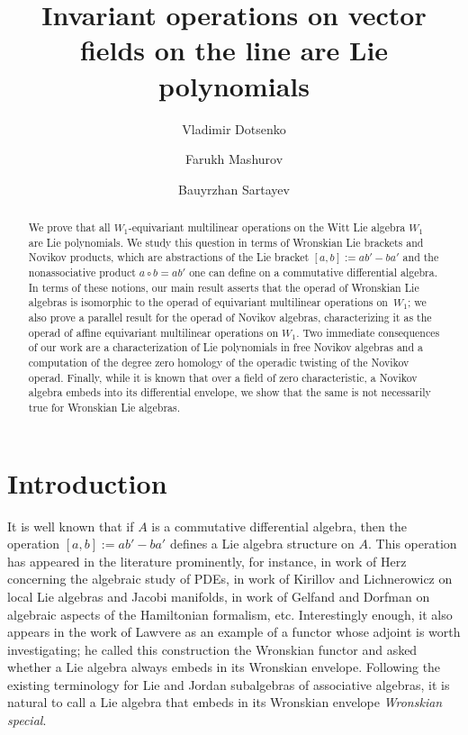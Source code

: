 \documentclass[11pt,reqno]{amsart}
\title{Invariant operations on vector fields on the line are Lie polynomials}
\author{Vladimir Dotsenko}
\author{Farukh Mashurov}
\author{Bauyrzhan Sartayev}
\theoremstyle{plain}
\theoremstyle{definition}
\theoremstyle{remark}
\begin{document}
\begin{abstract}
We prove that all $W_1$-equivariant multilinear operations on the Witt Lie algebra $W_1$ are Lie polynomials. We study this question in terms of Wronskian Lie brackets and Novikov products, which are abstractions of the Lie bracket $[a,b]:=ab'-ba'$ and the nonassociative product $a\circ b=ab'$ one can define on a commutative differential algebra. In terms of these notions, our main result asserts that the operad of Wronskian Lie algebras is isomorphic to the operad of equivariant multilinear operations on~$W_1$; we also prove a parallel result for the operad of Novikov algebras, characterizing it as the operad of affine equivariant multilinear operations on $W_1$. Two immediate consequences of our work are a characterization of Lie polynomials in free Novikov algebras and a computation of the degree zero homology of the operadic twisting of the Novikov operad. Finally, while it is known that over a field of zero characteristic, a Novikov algebra embeds into its differential envelope, we show that the same is not necessarily true for Wronskian Lie algebras.  
\end{abstract}

\maketitle

\section{Introduction}

It is well known that if $A$ is a commutative differential algebra, then the operation $[a,b]:=ab'-ba'$ defines a Lie algebra structure on $A$.  This operation has appeared in the literature prominently, for instance, in work of Herz \cite{MR69810} concerning the algebraic study of PDEs, in work of Kirillov \cite{MR438390} and Lichnerowicz \cite{MR524629} on local Lie algebras and Jacobi manifolds, in work of Gelfand and Dorfman \cite{GD} on algebraic aspects of the Hamiltonian formalism, etc. Interestingly enough, it also appears in the work of Lawvere \cite{MR231882} as an example of a functor whose adjoint is worth investigating; he called this construction the Wronskian functor and asked whether a Lie algebra always embeds in its Wronskian envelope. Following the existing terminology for Lie and Jordan subalgebras of associative algebras, it is natural to call a Lie algebra that embeds in its Wronskian envelope \emph{Wronskian special}.
\end{document}
